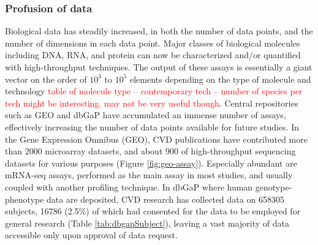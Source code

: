 \documentclass[letter]{bioinfo}
\newcommand{\comment}[1]{\textcolor{red}{#1}}
\begin{document}
	
	\subsubsection{Profusion of data}
	
	Biological data has steadily increased, in both the number of data points, and the number of dimensions in each data point.
	Major classes of biological molecules including DNA, RNA, and protein can now be characterized and/or quantified with high-throughput techniques. The output of these assays is essentially a giant vector on the order of $10^3$ to $10^5$ elements depending on the type of molecule and technology \comment{table of molecule type -- contemporary tech -- number of species per tech might be interesting. may not be very useful though}. Central repositories such as GEO and dbGaP have accumulated an immense number of assays, effectively increasing the number of data points available for future studies.
	In the Gene Expression Omnibus (GEO), CVD publications have contributed more than 2000 microarray datasets, and about 900 of high-throughput sequencing datasets for various purposes (Figure \ref{fig:geo-assay}). Especially abundant are mRNA-seq assays, performed as the main assay in most studies, and usually coupled with another profiling technique. In dbGaP where human genotype-phenotype data are deposited, CVD research has collected data on 658305 subjects, 16786 (2.5\%) of which had consented for the data to be employed for general research (Table \ref{tab:dbgapSubject}), leaving a vast majority of data accessible only upon approval of data request.
	
	
\end{document}
